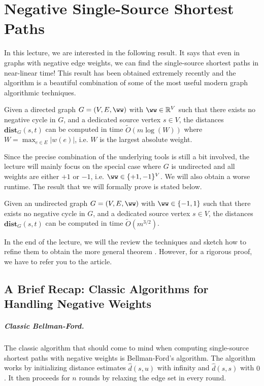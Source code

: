 \chapter{Negative Single-Source Shortest Paths}

In this lecture, we are interested in the following result. It says that even in graphs with negative edge weights, we can find the single-source shortest paths in near-linear time! This result has been obtained extremely recently and the algorithm is a beautiful combination of some of the most useful modern graph algorithmic techniques.

\begin{theorem}\label{thm:negativeSSSPBNW}
Given a directed graph $G=(V,E, \ww)$ with $\ww \in \mathbb{R}^V$ such that there exists no negative cycle in $G$,  and a dedicated source vertex $s \in V$, the distances $\mathbf{dist}_G(s,t)$ can be computed in time $\tilde{O}(m \log(W))$ where  $W = \max_{e \in E} |w(e)|$, i.e. $W$ is the largest absolute weight.
\end{theorem}

Since the precise combination of the underlying tools is still a bit involved,  the lecture will mainly focus on  the special case where $G$ is undirected and all weights are either $+1$ or $-1$, i.e. $\ww \in \{+1,-1\}^V$.  We will also obtain a worse runtime.  The result that we will formally prove is stated below.

\begin{theorem}
Given an undirected graph $G=(V,E, \ww)$ with $\ww \in \{-1, 1\}$ such that there exists no negative cycle in $G$,  and a dedicated source vertex $s \in V$, the distances $\mathbf{dist}_G(s,t)$ can be computed in time $\tilde{O}(m^{3/2})$.
\end{theorem}

In the end of the lecture, we will the review the techniques and sketch how to refine them to obtain the more general theorem .  However, for a rigorous proof, we have to refer you to the article. 


\section{A Brief Recap: Classic Algorithms for Handling Negative Weights}

\paragraph{Classic Bellman-Ford.} The classic algorithm that should come to mind when computing single-source shortest paths with negative weights is Bellman-Ford's algorithm. The algorithm works by initializing distance estimates $\hat{d}(s, u)$ with infinity and $\hat{d}(s,s)$ with $0$. It then proceeds for $n$ rounds by relaxing the edge set in every round. 

